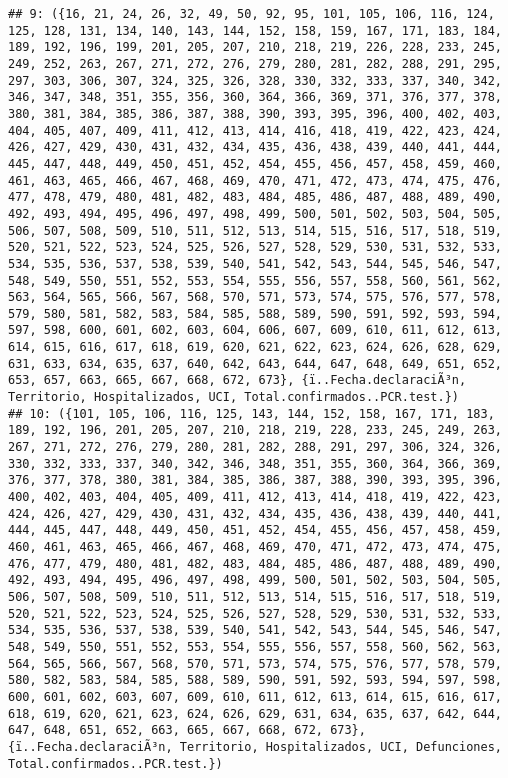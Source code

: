 \documentclass[
]{book}
\begin{document}
\begin{verbatim}
## 9: ({16, 21, 24, 26, 32, 49, 50, 92, 95, 101, 105, 106, 116, 124, 125, 128, 131, 134, 140, 143, 144, 152, 158, 159, 167, 171, 183, 184, 189, 192, 196, 199, 201, 205, 207, 210, 218, 219, 226, 228, 233, 245, 249, 252, 263, 267, 271, 272, 276, 279, 280, 281, 282, 288, 291, 295, 297, 303, 306, 307, 324, 325, 326, 328, 330, 332, 333, 337, 340, 342, 346, 347, 348, 351, 355, 356, 360, 364, 366, 369, 371, 376, 377, 378, 380, 381, 384, 385, 386, 387, 388, 390, 393, 395, 396, 400, 402, 403, 404, 405, 407, 409, 411, 412, 413, 414, 416, 418, 419, 422, 423, 424, 426, 427, 429, 430, 431, 432, 434, 435, 436, 438, 439, 440, 441, 444, 445, 447, 448, 449, 450, 451, 452, 454, 455, 456, 457, 458, 459, 460, 461, 463, 465, 466, 467, 468, 469, 470, 471, 472, 473, 474, 475, 476, 477, 478, 479, 480, 481, 482, 483, 484, 485, 486, 487, 488, 489, 490, 492, 493, 494, 495, 496, 497, 498, 499, 500, 501, 502, 503, 504, 505, 506, 507, 508, 509, 510, 511, 512, 513, 514, 515, 516, 517, 518, 519, 520, 521, 522, 523, 524, 525, 526, 527, 528, 529, 530, 531, 532, 533, 534, 535, 536, 537, 538, 539, 540, 541, 542, 543, 544, 545, 546, 547, 548, 549, 550, 551, 552, 553, 554, 555, 556, 557, 558, 560, 561, 562, 563, 564, 565, 566, 567, 568, 570, 571, 573, 574, 575, 576, 577, 578, 579, 580, 581, 582, 583, 584, 585, 588, 589, 590, 591, 592, 593, 594, 597, 598, 600, 601, 602, 603, 604, 606, 607, 609, 610, 611, 612, 613, 614, 615, 616, 617, 618, 619, 620, 621, 622, 623, 624, 626, 628, 629, 631, 633, 634, 635, 637, 640, 642, 643, 644, 647, 648, 649, 651, 652, 653, 657, 663, 665, 667, 668, 672, 673}, {ï..Fecha.declaraciÃ³n, Territorio, Hospitalizados, UCI, Total.confirmados..PCR.test.})
## 10: ({101, 105, 106, 116, 125, 143, 144, 152, 158, 167, 171, 183, 189, 192, 196, 201, 205, 207, 210, 218, 219, 228, 233, 245, 249, 263, 267, 271, 272, 276, 279, 280, 281, 282, 288, 291, 297, 306, 324, 326, 330, 332, 333, 337, 340, 342, 346, 348, 351, 355, 360, 364, 366, 369, 376, 377, 378, 380, 381, 384, 385, 386, 387, 388, 390, 393, 395, 396, 400, 402, 403, 404, 405, 409, 411, 412, 413, 414, 418, 419, 422, 423, 424, 426, 427, 429, 430, 431, 432, 434, 435, 436, 438, 439, 440, 441, 444, 445, 447, 448, 449, 450, 451, 452, 454, 455, 456, 457, 458, 459, 460, 461, 463, 465, 466, 467, 468, 469, 470, 471, 472, 473, 474, 475, 476, 477, 479, 480, 481, 482, 483, 484, 485, 486, 487, 488, 489, 490, 492, 493, 494, 495, 496, 497, 498, 499, 500, 501, 502, 503, 504, 505, 506, 507, 508, 509, 510, 511, 512, 513, 514, 515, 516, 517, 518, 519, 520, 521, 522, 523, 524, 525, 526, 527, 528, 529, 530, 531, 532, 533, 534, 535, 536, 537, 538, 539, 540, 541, 542, 543, 544, 545, 546, 547, 548, 549, 550, 551, 552, 553, 554, 555, 556, 557, 558, 560, 562, 563, 564, 565, 566, 567, 568, 570, 571, 573, 574, 575, 576, 577, 578, 579, 580, 582, 583, 584, 585, 588, 589, 590, 591, 592, 593, 594, 597, 598, 600, 601, 602, 603, 607, 609, 610, 611, 612, 613, 614, 615, 616, 617, 618, 619, 620, 621, 623, 624, 626, 629, 631, 634, 635, 637, 642, 644, 647, 648, 651, 652, 663, 665, 667, 668, 672, 673}, {ï..Fecha.declaraciÃ³n, Territorio, Hospitalizados, UCI, Defunciones, Total.confirmados..PCR.test.})

\end{verbatim}
\end{document}

